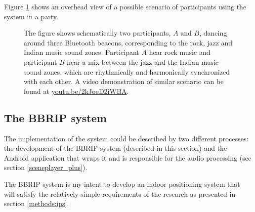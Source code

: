 \documentclass[a4paper,11pt]{article}
\begin{document}
Figure \ref{fig:sys:participant_view} shows an overhead view of a possible scenario of participants using the system in a party.

\begin{figure}[!htb]
	\centering
	\def\svgwidth{0.9\textwidth}
	
	\caption{The figure shows schematically two participants, $A$ and $B$, dancing around three Bluetooth beacons, corresponding to the rock, jazz and Indian music sound zones. Participant $A$ hear rock music and participant $B$ hear a mix between the jazz and the Indian music sound zones, which are rhythmically and harmonically synchronized with each other. A video demonstration of similar scenario can be found at \href{http://youtu.be/2kJoeD2iWBA}{youtu.be/2kJoeD2iWBA}.}\label{fig:sys:participant_view}
\end{figure}

\subsection{The BBRIP system}

The implementation of the system could be described by two different processes: the development of the BBRIP system (described in this section) and the Android application that wraps it and is responsible for the audio processing (see section \ref{sceneplayer_plus}).

The BBRIP system is my intent to develop an indoor positioning system that will satisfy the relatively simple requirements of the research as presented in section \ref{methods:ips}.
\end{document}

